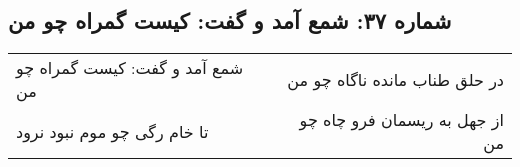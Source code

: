 \begin{center}
\section*{شماره ۳۷: شمع آمد و گفت: کیست گمراه چو من}
\label{sec:037}
\begin{longtable}{l p{0.5cm} r}
شمع آمد و گفت: کیست گمراه چو من
&&
در حلق طناب مانده ناگاه چو من
\\
تا خام رگی چو موم نبود نرود
&&
از جهل به ریسمان فرو چاه چو من
\\
\end{longtable}
\end{center}

